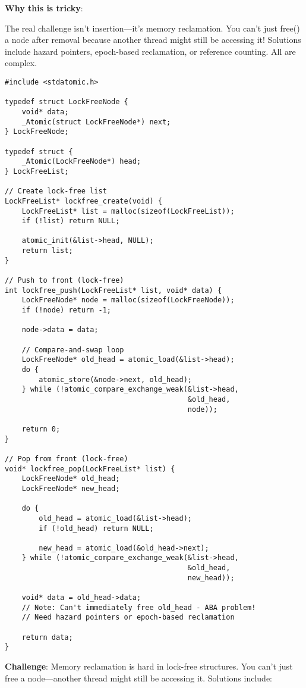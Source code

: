 \textbf{Why this is tricky}:

The real challenge isn't insertion—it's memory reclamation. You can't just free() a node after removal because another thread might still be accessing it! Solutions include hazard pointers, epoch-based reclamation, or reference counting. All are complex.

\begin{lstlisting}
#include <stdatomic.h>

typedef struct LockFreeNode {
    void* data;
    _Atomic(struct LockFreeNode*) next;
} LockFreeNode;

typedef struct {
    _Atomic(LockFreeNode*) head;
} LockFreeList;

// Create lock-free list
LockFreeList* lockfree_create(void) {
    LockFreeList* list = malloc(sizeof(LockFreeList));
    if (!list) return NULL;

    atomic_init(&list->head, NULL);
    return list;
}

// Push to front (lock-free)
int lockfree_push(LockFreeList* list, void* data) {
    LockFreeNode* node = malloc(sizeof(LockFreeNode));
    if (!node) return -1;

    node->data = data;

    // Compare-and-swap loop
    LockFreeNode* old_head = atomic_load(&list->head);
    do {
        atomic_store(&node->next, old_head);
    } while (!atomic_compare_exchange_weak(&list->head,
                                           &old_head,
                                           node));

    return 0;
}

// Pop from front (lock-free)
void* lockfree_pop(LockFreeList* list) {
    LockFreeNode* old_head;
    LockFreeNode* new_head;

    do {
        old_head = atomic_load(&list->head);
        if (!old_head) return NULL;

        new_head = atomic_load(&old_head->next);
    } while (!atomic_compare_exchange_weak(&list->head,
                                           &old_head,
                                           new_head));

    void* data = old_head->data;
    // Note: Can't immediately free old_head - ABA problem!
    // Need hazard pointers or epoch-based reclamation

    return data;
}
\end{lstlisting}

\textbf{Challenge}: Memory reclamation is hard in lock-free structures. You can't just free a node—another thread might still be accessing it. Solutions include:

